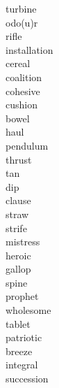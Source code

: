 \documentclass[b5paper, 11pt]{ctexart}
\begin{document}
\begin{multicols*}{3}
\begin{description}
\item[turbine]

\item[odo(u)r]

\item[rifle]

\item[installation]

\item[cereal]

\item[coalition]

\item[cohesive]

\item[cushion]

\item[bowel]

\item[haul]

\item[pendulum]

\item[thrust]

\item[tan]

\item[dip]

\item[clause]

\item[straw]

\item[strife]

\item[mistress]

\item[heroic]

\item[gallop]

\item[spine]

\item[prophet]

\item[wholesome]

\item[tablet]

\item[patriotic]

\item[breeze]

\item[integral]

\item[succession]


\end{description}
\end{multicols*}
\end{document}
